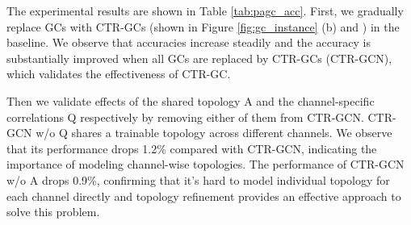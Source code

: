 \documentclass[10pt,twocolumn,letterpaper]{article}
\begin{document}
The experimental results are shown in Table \ref{tab:pagc_acc}. First, we gradually replace GCs with CTR-GCs (shown in Figure \ref{fig:gc_instance} (b) and ) in the baseline. We observe that accuracies increase steadily and the accuracy is substantially improved when all GCs are replaced by CTR-GCs (CTR-GCN), which validates the effectiveness of CTR-GC. 

Then we validate effects of the shared topology A and the channel-specific correlations Q respectively by removing either of them from CTR-GCN. CTR-GCN w/o Q shares a trainable topology across different channels. We observe that its performance drops 1.2\% compared with CTR-GCN, indicating the importance of modeling channel-wise topologies. The performance of CTR-GCN w/o A drops 0.9\%, confirming that it's hard to model individual topology for each channel directly and topology refinement provides an effective approach to solve this problem.
\end{document}
